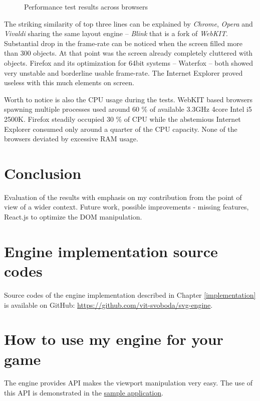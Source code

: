\documentclass[11pt,oneside, final]{fithesis2}
\begin{document}
\begin{figure}[h]
	\centering
	
	\caption{Performance test results across browsers}
	\label{performance-basic}
\end{figure}

The striking similarity of top three lines can be explained by \emph{Chrome}, \emph{Opera} and \emph{Vivaldi} sharing the same layout engine -- \emph{Blink} that is a fork of \emph{WebKIT}. Substantial drop in the frame-rate can be noticed when the screen filled more than 300 objects. At that point was the screen already completely cluttered with objects. Firefox and its optimization for 64bit systems -- Waterfox -- both showed very unstable and borderline usable frame-rate. The Internet Explorer proved useless with this much elements on screen.

Worth to notice is also the CPU usage during the tests. WebKIT based browsers spawning multiple processes used around 60 \% of available 3.3GHz 4core Intel i5 2500K. Firefox steadily occupied 30 \% of CPU while the abstemious Internet Explorer consumed only around a quarter of the CPU capacity. None of the browsers deviated by excessive RAM usage.

\chapter{Conclusion}
Evaluation of the results with emphasis on my contribution from the point of view of a wider context.
Future work, possible improvements - missing features, React.js to optimize the DOM manipulation.


\appendix
\chapter{Engine implementation source codes}
Source codes of the engine implementation described in Chapter \ref{implementation} is available on GitHub: \href{https://github.com/vit-svoboda/svg-engine}{https://github.com/vit-svoboda/svg-engine}.

\chapter{How to use my engine for your game}
The engine provides API makes the viewport manipulation very easy. The use of this API is demonstrated in the \href{https://github.com/vit-svoboda/svg-engine/tree/master/src/main/webapp/Scripts/game}{sample application}.
\end{document}

